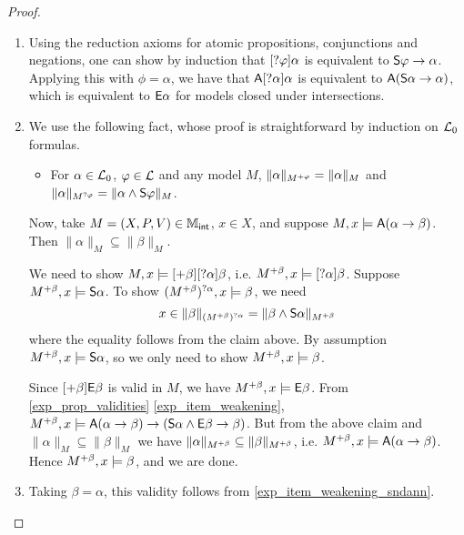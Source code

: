 \begin{proof}\leavevmode
\begin{enumerate}
\item Using the reduction axioms for atomic propositions, conjunctions and
negations, one can show by induction that $[?\varphi]\alpha$
is equivalent to $\mathsf{S}\varphi \to \alpha$. Applying this with
$\phi = \alpha$, we have that $\mathsf{A}[?\alpha]\alpha$ is
equivalent to $\mathsf{A}(\mathsf{S}\alpha \to \alpha)$, which is
equivalent to $\mathsf{E}\alpha$ for models closed under intersections.

    \item We use the following fact, whose proof is straightforward by
induction on $\mathcal{L}_0$ formulas.

    \begin{itemize}
    \item For $\alpha \in \mathcal{L}_0$, $\varphi \in \mathcal{L}$ and any model
$M$, $\|\alpha\|_{M^{+\varphi}} = \|\alpha\|_M$ and
$\|\alpha\|_{M^{?\varphi}} = \|\alpha \land \mathsf{S}\varphi\|_M$.

        \end{itemize}
    Now, take $M = (X, P, V) \in \mathbb{M}_{\mathsf{int}}$, $x \in X$, and
suppose $M, x \models \mathsf{A}(\alpha \to \beta)$. Then
$\|\alpha\|_M \subseteq \|\beta\|_M$.

    We need to show $M, x \models
[+\beta][?\alpha]\beta$, i.e. $M^{+\beta}, x
\models [?\alpha]\beta$. Suppose $M^{+\beta}, x
\models \mathsf{S}\alpha$. To show $(M^{+\beta})^{?\alpha},
x \models \beta$, we need
    \[
    x \in \|\beta\|_{(M^{+\beta})^{?\alpha}}
= \|\beta \land \mathsf{S}\alpha\|_{M^{+\beta}}\]
    where the equality follows from the claim above. By assumption
$M^{+\beta}, x \models \mathsf{S}\alpha$, so we only need to show
$M^{+\beta}, x \models \beta$.

Since $[+\beta]\mathsf{E}\beta$ is valid in $M$, we have $M^{+\beta}, x
\models \mathsf{E}\beta$. From \cref{exp_prop_validities} \cref{exp_item_weakening},
        $M^{+\beta}, x \models \mathsf{A}(\alpha \to \beta) \to
        (\mathsf{S}\alpha \land \mathsf{E}\beta \to \beta)$.  But from the above claim
        and $\|\alpha\|_M \subseteq \|\beta\|_M$ we have
        $\|\alpha\|_{M^{+\beta}} \subseteq \|\beta\|_{M^{+\beta}}$,
        i.e. $M^{+\beta}, x \models \mathsf{A}(\alpha \to \beta)$. Hence
        $M^{+\beta}, x \models \beta$, and we are done.

    \item Taking $\beta = \alpha$, this validity follows from
        \cref{exp_item_weakening_sndann}.

    \end{enumerate}
\end{proof}

